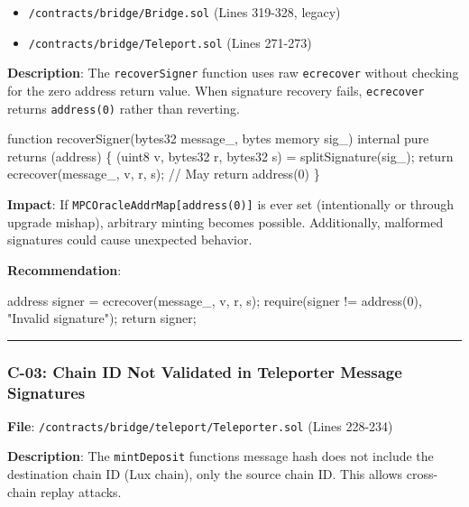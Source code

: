 \documentclass[
]{article}
\newenvironment{Shaded}{}{}
\newcommand{\NormalTok}[1]{#1}
\providecommand{\tightlist}{%
  \setlength{\itemsep}{0pt}\setlength{\parskip}{0pt}}
\begin{document}
\begin{itemize}
\tightlist
\item
  \texttt{/contracts/bridge/Bridge.sol} (Lines 319-328, legacy)
\item
  \texttt{/contracts/bridge/Teleport.sol} (Lines 271-273)
\end{itemize}

\textbf{Description}: The \texttt{recoverSigner} function uses raw
\texttt{ecrecover} without checking for the zero address return value.
When signature recovery fails, \texttt{ecrecover} returns
\texttt{address(0)} rather than reverting.

\begin{Shaded}
\begin{Highlighting}[]
\NormalTok{function recoverSigner(bytes32 message\_, bytes memory sig\_) internal pure returns (address) \{}
\NormalTok{    (uint8 v, bytes32 r, bytes32 s) = splitSignature(sig\_);}
\NormalTok{    return ecrecover(message\_, v, r, s);  // May return address(0)}
\NormalTok{\}}
\end{Highlighting}
\end{Shaded}

\textbf{Impact}: If \texttt{MPCOracleAddrMap{[}address(0){]}} is ever
set (intentionally or through upgrade mishap), arbitrary minting becomes
possible. Additionally, malformed signatures could cause unexpected
behavior.

\textbf{Recommendation}:

\begin{Shaded}
\begin{Highlighting}[]
\NormalTok{address signer = ecrecover(message\_, v, r, s);}
\NormalTok{require(signer != address(0), "Invalid signature");}
\NormalTok{return signer;}
\end{Highlighting}
\end{Shaded}

\begin{center}\rule{0.5\linewidth}{0.5pt}\end{center}

\subsubsection{C-03: Chain ID Not Validated in Teleporter Message
Signatures}\label{c-03-chain-id-not-validated-in-teleporter-message-signatures}

\textbf{File}: \texttt{/contracts/bridge/teleport/Teleporter.sol} (Lines
228-234)

\textbf{Description}: The \texttt{mintDeposit}
function\textquotesingle s message hash does not include the destination
chain ID (Lux chain), only the source chain ID. This allows cross-chain
replay attacks.
\end{document}
